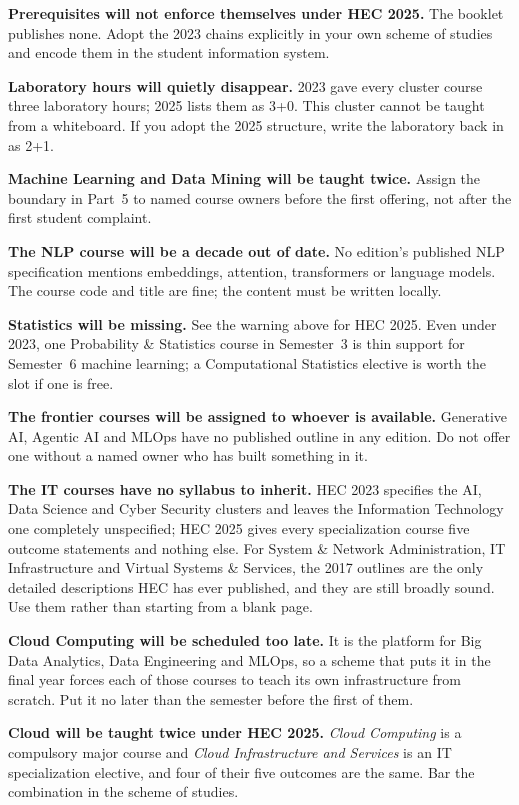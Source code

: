 \documentclass[11pt,a4paper,oneside]{report}
\begin{document}
\begin{tightnum}
  \item \textbf{Prerequisites will not enforce themselves under HEC 2025.} The
        booklet publishes none. Adopt the 2023 chains explicitly in your own
        scheme of studies and encode them in the student information system.
  \item \textbf{Laboratory hours will quietly disappear.} 2023 gave every cluster
        course three laboratory hours; 2025 lists them as 3+0. This cluster
        cannot be taught from a whiteboard. If you adopt the 2025 structure,
        write the laboratory back in as 2+1.
  \item \textbf{Machine Learning and Data Mining will be taught twice.} Assign
        the boundary in Part~5 to named course owners before the first offering,
        not after the first student complaint.
  \item \textbf{The NLP course will be a decade out of date.} No edition's
        published NLP specification mentions embeddings, attention, transformers
        or language models. The course code and title are fine; the content must
        be written locally.
  \item \textbf{Statistics will be missing.} See the warning above for HEC 2025.
        Even under 2023, one Probability \& Statistics course in Semester~3 is
        thin support for Semester~6 machine learning; a Computational Statistics
        elective is worth the slot if one is free.
  \item \textbf{The frontier courses will be assigned to whoever is available.}
        Generative AI, Agentic AI and MLOps have no published outline in any
        edition. Do not offer one without a named owner who has built something
        in it.
  \item \textbf{The IT courses have no syllabus to inherit.} HEC 2023 specifies
        the AI, Data Science and Cyber Security clusters and leaves the
        Information Technology one completely unspecified; HEC 2025 gives every
        specialization course five outcome statements and nothing else. For
        System \& Network Administration, IT Infrastructure and Virtual Systems \&
        Services, the 2017 outlines are the only detailed descriptions HEC has
        ever published, and they are still broadly sound. Use them rather than
        starting from a blank page.
  \item \textbf{Cloud Computing will be scheduled too late.} It is the platform
        for Big Data Analytics, Data Engineering and MLOps, so a scheme that puts
        it in the final year forces each of those courses to teach its own
        infrastructure from scratch. Put it no later than the semester before the
        first of them.
  \item \textbf{Cloud will be taught twice under HEC 2025.} \emph{Cloud
        Computing} is a compulsory major course and \emph{Cloud Infrastructure and
        Services} is an IT specialization elective, and four of their five
        outcomes are the same. Bar the combination in the scheme of studies.
\end{tightnum}
\end{document}
